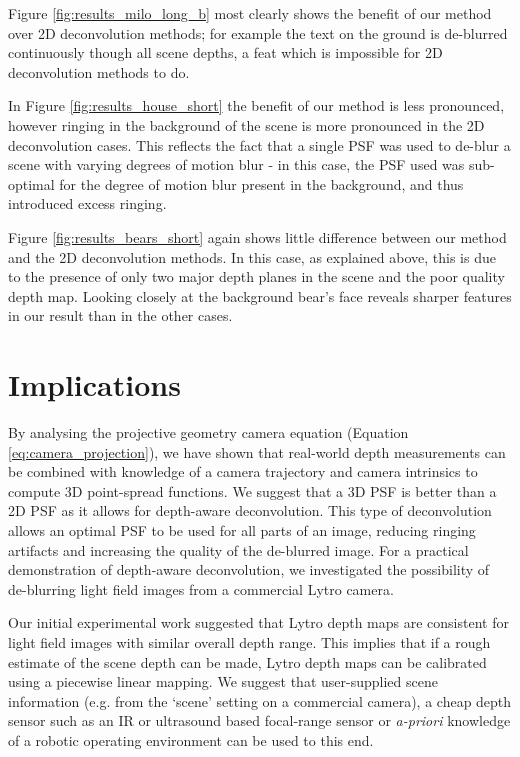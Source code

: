 Figure \ref{fig:results_milo_long_b} most clearly shows the benefit of our method over 2D deconvolution methods; for example the text on the ground is de-blurred continuously though all scene depths, a feat which is impossible for 2D deconvolution methods to do.

In Figure \ref{fig:results_house_short} the benefit of our method is less pronounced, however ringing in the background of the scene is more pronounced in the 2D deconvolution cases.
This reflects the fact that a single PSF was used to de-blur a scene with varying degrees of motion blur - in this case, the PSF used was sub-optimal for the degree of motion blur present in the background, and thus introduced excess ringing.

Figure \ref{fig:results_bears_short} again shows little difference between our method and the 2D deconvolution methods.
In this case, as explained above, this is due to the presence of only two major depth planes in the scene and the poor quality depth map.
Looking closely at the background bear's face reveals sharper features in our result than in the other cases.

\section{Implications}
\label{sec:implications}

By analysing the projective geometry camera equation (Equation \ref{eq:camera_projection}), we have shown that real-world depth measurements can be combined with knowledge of a camera trajectory and camera intrinsics to compute 3D point-spread functions.
We suggest that a 3D PSF is better than a 2D PSF as it allows for depth-aware deconvolution.
This type of deconvolution allows an optimal PSF to be used for all parts of an image, reducing ringing artifacts and increasing the quality of the de-blurred image.
For a practical demonstration of depth-aware deconvolution, we investigated the possibility of de-blurring light field images from a commercial Lytro camera.

Our initial experimental work suggested that Lytro depth maps are consistent for light field images with similar overall depth range.
This implies that if a rough estimate of the scene depth can be made, Lytro depth maps can be calibrated using a piecewise linear mapping.
We suggest that user-supplied scene information (e.g. from the \enquote*{scene} setting on a commercial camera), a cheap depth sensor such as an IR or ultrasound based focal-range sensor or \emph{a-priori} knowledge of a robotic operating environment can be used to this end.

